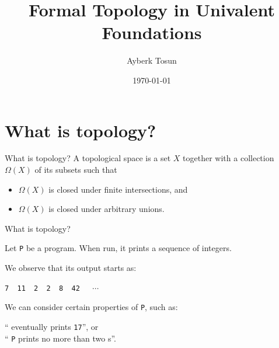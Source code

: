 \documentclass[xcolor={dvipsnames}]{beamer}
\title{Formal Topology in Univalent Foundations}
\date{\today}
\author{Ayberk Tosun}
\institute{Chalmers University of Technology}
\newcommand{\fnname}[1]{{\color{codecolour} {\tt #1}}}
\newcommand{\prgoutput}[1]{{\color{codecolour} {\tt #1}}}
\begin{document}
\maketitle

\section{What is topology?}

\begin{frame}{What is topology?}
  \large
  A topological space is a set $X$ together with a collection $\Omega(X)$ of its subsets
  such that
  \begin{itemize}
    \item $\Omega(X)$ is closed under \alert{finite} intersections, and
    \item $\Omega(X)$ is closed under \alert{arbitrary} unions.
  \end{itemize}
\end{frame}

\begin{frame}[c]{What is topology?}
  \large
  \vspace{1em}

  Let \fnname{P} be a program. When run, it prints a sequence of integers.

  \vspace{1em}

  We \alert{observe} that its output starts as:

  \begin{center}
  \prgoutput{7~~11~~2~~2~~8~~42~~}~$\cdots$
  \end{center}

  We can consider certain properties of \fnname{P}, such as:
  \begin{center}
    ``\tikzmarknode{a}{\fnname{P}} eventually prints \fnname{17}'', or\\
    \vspace{1em}
    ``\fnname{P} prints no more than two \tikzmarknode{b}{\fnname{2}}s''.
  \end{center}

\end{frame}
\end{document}
